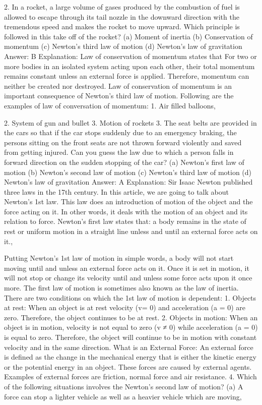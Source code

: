 2. In a rocket, a large volume of gases produced by the
combustion of fuel is allowed to escape through its tail nozzle in
the downward direction with the tremendous speed and makes
the rocket to move upward.
Which principle is followed in this take off of the rocket?
(a) Moment of inertia
(b) Conservation of momentum
(c) Newton’s third law of motion
(d) Newton’s law of gravitation
Answer: B
Explanation: Law of conservation of momentum states that
For two or more bodies in an isolated system acting upon each other,
their total momentum remains constant unless an external force is
applied. Therefore, momentum can neither be created nor
destroyed.
Law of conservation of momentum is an important consequence of
Newton’s third law of motion.
Following are the examples of law of conversation of momentum:
1. Air filled balloons, 


2. System of gun and bullet
3. Motion of rockets
3. The seat belts are provided in the cars so that if the car
stops suddenly due to an emergency braking, the persons sitting
on the front seats are not thrown forward violently and saved
from getting injured. Can you guess the law due to which a
person falls in forward direction on the sudden stopping of the
car?
(a) Newton’s first law of motion
(b) Newton’s second law of motion
(c) Newton’s third law of motion
(d) Newton’s law of gravitation
Answer: A
Explanation: Sir Isaac Newton published three laws in the
17th century. In this article, we are going to talk about Newton’s
1st law. This law does an introduction of motion of the object and the
force acting on it. In other words, it deals with the motion of an
object and its relation to force.
Newton’s first law states that: a body remains in the state of rest
or uniform motion in a straight line unless and until an external force
acts on it., 


Putting Newton’s 1st law of motion in simple words, a body will not
start moving until and unless an external force acts on it. Once it is
set in motion, it will not stop or change its velocity until and unless
some force acts upon it once more. The first law of motion is
sometimes also known as the law of inertia.
There are two conditions on which the 1st law of motion is
dependent:
1. Objects at rest: When an object is at rest velocity (v= 0) and
acceleration (a = 0) are zero. Therefore, the object continues to be
at rest.
2. Objects in motion: When an object is in motion, velocity is not
equal to zero (v ≠ 0) while acceleration (a = 0) is equal to zero.
Therefore, the object will continue to be in motion with constant
velocity and in the same direction.
What is an External Force: An external force is defined as the
change in the mechanical energy that is either the kinetic energy or
the potential energy in an object. These forces are caused by
external agents. Examples of external forces are friction, normal
force and air resistance.
4. Which of the following situations involves the Newton’s second
law of motion?
(a) A force can stop a lighter vehicle as well as a heavier vehicle
which are moving, 


